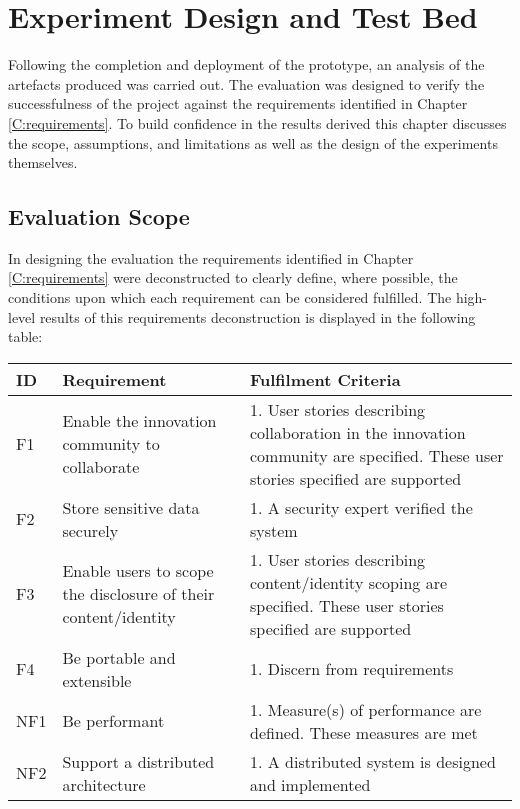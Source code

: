 \chapter{Experiment Design and Test Bed}
Following the completion and deployment of the prototype, an analysis of the artefacts produced was carried out. The evaluation was designed to verify the successfulness of the project against the requirements identified in Chapter \ref{C:requirements}. To build confidence in the results derived this chapter discusses the scope, assumptions, and limitations as well as the design of the experiments themselves.

\section{Evaluation Scope}
In designing the evaluation the requirements identified in Chapter \ref{C:requirements} were deconstructed to clearly define, where possible, the conditions upon which each requirement can be considered fulfilled. The high-level results of this requirements deconstruction is displayed in the following table:

\begin{adjustwidth}{-1.25cm}{}
\begin{tabular}{ |p{1cm}||p{6cm}|p{10cm}|  }
 \hline
 ID & Requirement & Fulfilment Criteria\\
 \hline
    F1 & Enable the innovation community to collaborate & 1. User stories describing collaboration in the innovation 
  community are specified\newline2. These user stories specified are supported\\
\hline
    F2 & Store sensitive data securely & 1. A security expert verified the system\\
\hline
    F3 & Enable users to scope the disclosure of their content/identity & 1. User stories describing content/identity scoping are specified\newline2. These user stories specified are supported\\
 \hline
    F4 & Be portable and extensible & 1. Discern from requirements\\
 \hline
    NF1 & Be performant & 1. Measure(s) of performance are defined\newline2. These measures are met\\
 \hline
    NF2 & Support a distributed architecture & 1. A distributed system is designed and implemented\\
 \hline
\end{tabular}
\end{adjustwidth}
\vspace{1em}

